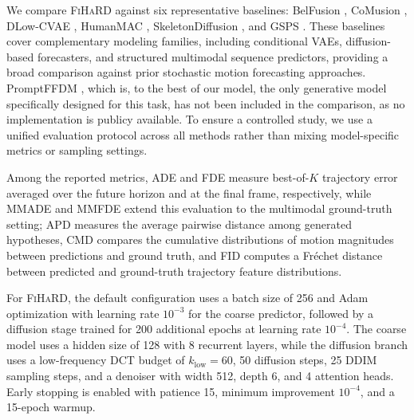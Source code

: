 \documentclass[runningheads]{llncs}
\newcommand{\modelname}{\textsc{FiHaRD}}
\begin{document}
We compare \modelname{} against six representative baselines: BelFusion \cite{barquero2023belfusion}, CoMusion \cite{Sun2024CoMusion}, DLow-CVAE \cite{Yuan2020DLow}, HumanMAC \cite{Chen2023HumanMAC}, SkeletonDiffusion \cite{Curreli2025SkeletonDiffusion}, and GSPS \cite{mao2021gsps}. These baselines cover complementary modeling families, including conditional VAEs, diffusion-based forecasters, and structured multimodal sequence predictors, providing a broad comparison against prior stochastic motion forecasting approaches. PromptFFDM \cite{Tang2024PromptFDDM}, which is, to the best of our model, the only generative model specifically designed for this task, has not been included in the comparison, as no implementation is publicy available. To ensure a controlled study, we use a unified evaluation protocol across all methods rather than mixing model-specific metrics or sampling settings.

Among the reported metrics, ADE and FDE measure best-of-$K$ trajectory error averaged over the future horizon and at the final frame, respectively, while MMADE and MMFDE extend this evaluation to the multimodal ground-truth setting; APD measures the average pairwise distance among generated hypotheses, CMD compares the cumulative distributions of motion magnitudes between predictions and ground truth, and FID computes a Fr\'echet distance between predicted and ground-truth trajectory feature distributions.

For \modelname{}, the default configuration uses a batch size of 256 and Adam optimization with learning rate $10^{-3}$ for the coarse predictor, followed by a diffusion stage trained for 200 additional epochs at learning rate $10^{-4}$. The coarse model uses a hidden size of 128 with 8 recurrent layers, while the diffusion branch uses a low-frequency DCT budget of $k_{\mathrm{low}}=60$, 50 diffusion steps, 25 DDIM sampling steps, and a denoiser with width 512, depth 6, and 4 attention heads. Early stopping is enabled with patience 15, minimum improvement $10^{-4}$, and a 15-epoch warmup.
\end{document}
